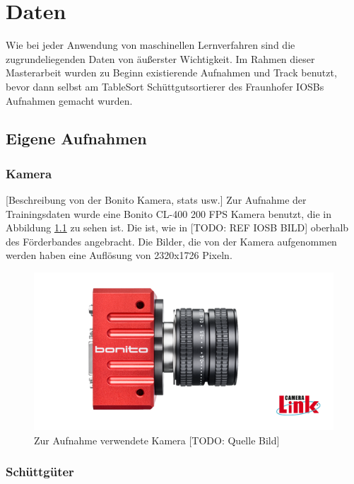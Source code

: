 \chapter{Daten}

Wie bei jeder Anwendung von maschinellen Lernverfahren sind die zugrundeliegenden Daten von äußerster Wichtigkeit.
Im Rahmen dieser Masterarbeit wurden zu Beginn existierende Aufnahmen und Track benutzt, 
bevor dann selbst am TableSort Schüttgutsortierer des Fraunhofer IOSBs Aufnahmen gemacht wurden.


\section{Eigene Aufnahmen}

\subsection{Kamera}

[Beschreibung von der Bonito Kamera, stats usw.]
Zur Aufnahme der Trainingsdaten wurde eine Bonito CL-400 200 FPS Kamera benutzt, die in Abbildung \ref{pictureCam} zu sehen ist.
Die ist, wie in [TODO: REF IOSB BILD] oberhalb des Förderbandes angebracht.
Die Bilder, die von der Kamera aufgenommen werden haben eine Auflösung von 2320x1726 Pixeln.

\begin{figure}
    \centering
    \includegraphics[width=\textwidth]{img/banner-Bonito_cropped}
    \caption{Zur Aufnahme verwendete Kamera [TODO: Quelle Bild]}
    \label{pictureCam}
\end{figure}

\subsection{Schüttgüter}

